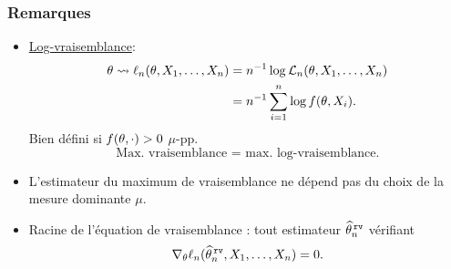 %
\begin{frame}
\frametitle{Remarques}
\begin{itemize}
\item \underline{Log-vraisemblance}:
\begin{align*}\theta \leadsto \ell_n(\theta, X_1,\ldots, X_n)& = n^{-1} \log {\mathcal L}_n(\theta, X_1,\ldots, X_n)\\
& = n^{-1} \sum_{i = 1}^n \log f(\theta, X_i).
\end{align*}
\alert{Bien défini} si $f(\theta, \cdot) >0$ $\mu$-pp.
$$\text{Max. vraisemblance = max. log-vraisemblance.}$$
\item L'estimateur du maximum de vraisemblance \alert{ ne dépend pas} du choix de la mesure dominante $\mu$.
\item \alert{Racine de l'équation de vraisemblance} : tout estimateur $\widehat {\theta}_n^{\,{\tt rv}}$ vérifiant
$$\nabla_\theta \ell_n(\widehat {\theta}_n^{\,{\tt rv}}, X_1,\ldots, X_n) = 0.$$
\end{itemize}
\end{frame}

